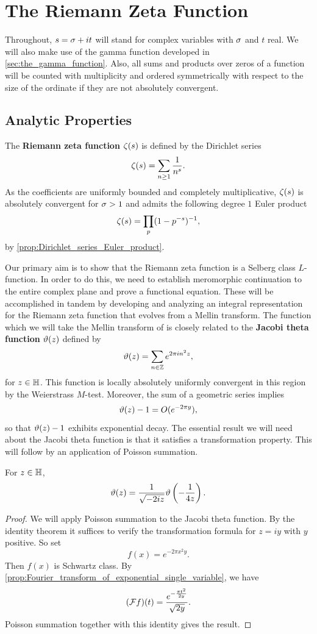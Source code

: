 \chapter{The Riemann Zeta Function}
  Throughout, \(s = \sigma+it\) will stand for complex variables with \(\sigma\) and \(t\) real. We will also make use of the gamma function developed in \cref{sec:the_gamma_function}. Also, all sums and products over zeros of a function will be counted with multiplicity and ordered symmetrically with respect to the size of the ordinate if they are not absolutely convergent.
  \section{Analytic Properties}
    The \textbf{Riemann zeta function} \(\zeta(s)\) is defined by the Dirichlet series
    \[
      \zeta(s) = \sum_{n \ge 1}\frac{1}{n^{s}}.
    \]
    As the coefficients are uniformly bounded and completely multiplicative, \(\zeta(s)\) is absolutely convergent for \(\sigma > 1\) and admits the following degree \(1\) Euler product
    \[
      \zeta(s) = \prod_{p}(1-p^{-s})^{-1},
    \]
    by \cref{prop:Dirichlet_series_Euler_product}.

    Our primary aim is to show that the Riemann zeta function is a Selberg class \(L\)-function. In order to do this, we need to establish meromorphic continuation to the entire complex plane and prove a functional equation. These will be accomplished in tandem by developing and analyzing an integral representation for the Riemann zeta function that evolves from a Mellin transform. The function which we will take the Mellin transform of is closely related to the \textbf{Jacobi theta function} \(\vartheta(z)\) defined by
    \[
      \vartheta(z) = \sum_{n \in \mathbb{Z}}e^{2\pi in^{2}z},
    \]
    for \(z \in \mathbb{H}\). This function is locally absolutely uniformly convergent in this region by the Weierstrass \(M\)-test. Moreover, the sum of a geometric series implies
    \[
      \vartheta(z)-1 = O(e^{-2\pi y}),
    \]
    so that \(\vartheta(z)-1\) exhibits exponential decay. The essential result we will need about the Jacobi theta function is that it satisfies a transformation property. This will follow by an application of Poisson summation.

    \begin{theorem}\label{thm:functional_equation_Jacobi_theta}
      For \(z \in \mathbb{H}\),
      \[
        \vartheta(z) = \frac{1}{\sqrt{-2iz}}\vartheta\left(-\frac{1}{4z}\right).
      \]
    \end{theorem}
    \begin{proof}
      We will apply Poisson summation to the Jacobi theta function. By the identity theorem it suffices to verify the transformation formula for \(z = iy\) with \(y\) positive. So set
      \[
        f(x) = e^{-2\pi x^{2}y}.
      \]
      Then \(f(x)\) is Schwartz class. By \cref{prop:Fourier_transform_of_exponential_single_variable}, we have
      \[
        (\mathcal{F}f)(t) = \frac{e^{-\frac{\pi t^{2}}{2y}}}{\sqrt{2y}}.
      \]
      Poisson summation together with this identity gives the result.
    \end{proof}


